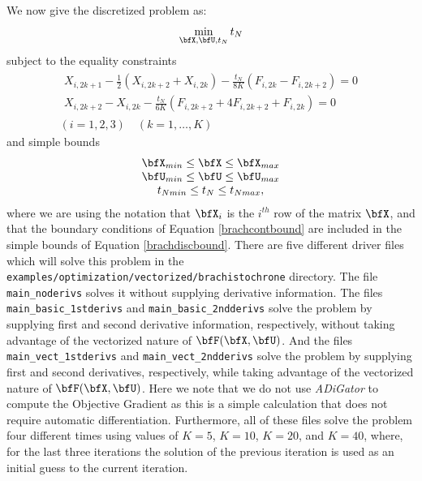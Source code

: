 \documentclass[10pt,pdftex]{article}
\begin{document}
We now give the discretized problem  as:
\begin{equation}
\min\limits_{\bfX, \bfU, t_N} t_N 
\end{equation}
subject to the equality constraints
\begin{equation}\label{bracheqcons}
\begin{array}{c}
\begin{array}{r}
X_{i,2k+1} - \frac{1}{2}(X_{i,2k+2} + X_{i,2k}) - \frac{t_N}{8K}(F_{i,2k} - F_{i,2k+2}) = 0 \\
X_{i,2k+2} - X_{i,2k} - \frac{t_N}{6K}(F_{i,2k+2} + 4F_{i,2k+2}  + F_{i,2k} ) = 0
\end{array}\\
(i = 1,2,3) \quad (k = 1,\dots,K)
\end{array}
\end{equation}
and simple bounds
\begin{equation}\label{brachdiscbound}
\begin{array}{c}
\bfX_{min} \leq \bfX \leq \bfX_{max} \\
\bfU_{min} \leq \bfU \leq \bfU_{max} \\
t_{Nmin} \leq t_N \leq t_{Nmax},
\end{array}
\end{equation}
where we are using the notation that $\bfX_i$ is the $i^{th}$ row of the matrix $\bfX$, and that the boundary conditions of Equation \ref{brachcontbound} are included in the simple bounds of Equation \ref{brachdiscbound}. There are five different driver files which will solve this problem in the \texttt{examples/optimization/vectorized/brachistochrone} directory. The file \texttt{main\_noderivs} solves it without supplying derivative information. The files \texttt{main\_basic\_1stderivs} and \texttt{main\_basic\_2ndderivs} solve the problem by supplying first and second derivative information, respectively, without taking advantage of the vectorized nature of $\bfF(\bfX,\bfU)$. And the files \texttt{main\_vect\_1stderivs} and \texttt{main\_vect\_2ndderivs} solve the problem by supplying first and second derivatives, respectively, while taking advantage of the vectorized nature of $\bfF(\bfX,\bfU)$. Here we note that we do not use \emph{ADiGator} to compute the Objective Gradient as this is a simple calculation that does not require automatic differentiation. Furthermore, all of these files solve the problem four different times using values of $K = 5$, $K = 10$, $K = 20$, and $K = 40$, where, for the last three iterations the solution of the previous iteration is used as an initial guess to the current iteration.
\end{document}
